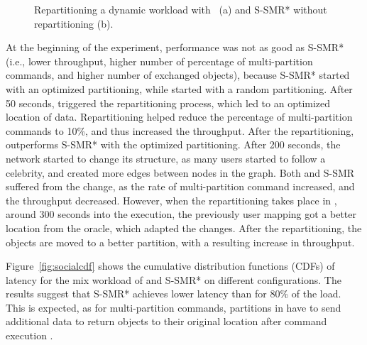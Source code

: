 \begin{figure}[h!]
\begin{subfigure}{.40\textwidth}
    \caption{}
  \end{subfigure}
  \caption{Repartitioning a dynamic workload with \dynastar~(a) and S-SMR* without repartitioning (b).}%
  \label{fig:socialcelebrity}
\end{figure}

At the beginning of the experiment, \dynastar performance was not as good as
S-SMR* (i.e., lower throughput, higher number of percentage of multi-partition
commands, and higher number of exchanged objects), because S-SMR* started with
an optimized partitioning, while \dynastar started with a random partitioning.
After 50 seconds, \dynastar triggered the repartitioning process, which led to
an optimized location of data. Repartitioning helped reduce the percentage of
multi-partition commands to 10\%, and thus increased the throughput. After the
repartitioning, \dynastar outperforms S-SMR* with the optimized partitioning.
After 200 seconds, the network started to change its structure, as many users
started to follow a celebrity, and created more edges between nodes in the
graph. Both \dynastar and S-SMR suffered from the change, as the rate of
multi-partition command increased, and the throughput decreased. However, when
the repartitioning takes place in \dynastar, around 300 seconds into the
execution, the previously user mapping got a better location from the oracle,
which adapted the changes. After the repartitioning, the objects are moved to a
better partition, with a resulting increase in throughput.

Figure~\ref{fig:socialcdf} shows the cumulative distribution functions (CDFs) of
latency for the mix workload of \dynastar and S-SMR* on different
configurations. The results suggest that S-SMR* achieves lower latency than
\dynastar for 80\% of the load. This is expected, as for multi-partition
commands, partitions in \dynastar have to send additional data to return objects
to their original location after command execution .

